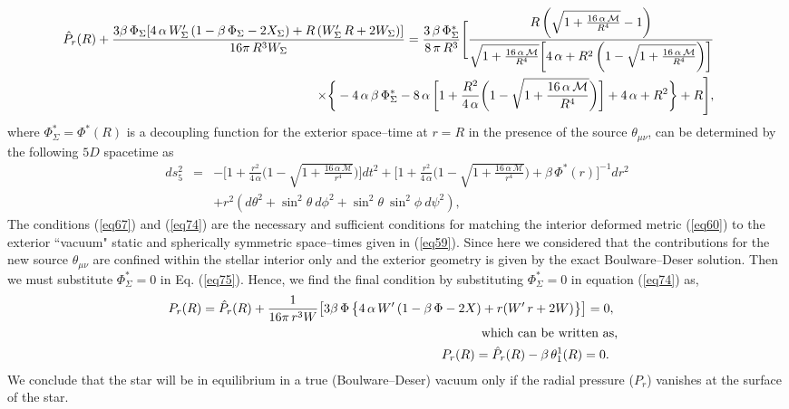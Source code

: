\documentclass[]{aastex631}
\begin{document}
\begin{eqnarray}
&&\hspace{-0.8cm} \hat{P}_r(R)+\frac{3 \beta\,\Phi_{\Sigma} [4 \,\alpha\, W_{\Sigma}^\prime\, (1 - \beta\, \Phi_{\Sigma} -2 X_{\Sigma}) + R\, (W_{\Sigma}^\prime\, R + 2 W_{\Sigma})]}{16 \pi\,R^3 W_{\Sigma}} =\frac{3\,\beta\,\Phi^{\ast}_{\Sigma}}{8\,\pi\,R^3} \Bigg[ \frac{R\, \bigg(\sqrt{1 + \frac{16\, \alpha\, \mathcal{M}}{R^4}}-1\bigg)}{\sqrt{1 + \frac{16 \,\alpha\, \mathcal{M}}{R^4}} \bigg[4 \,\alpha +R^2\, \bigg(1 - \sqrt{1 + \frac{16\,\alpha\, \mathcal{M}}{R^4}}\bigg) \bigg]}\nonumber\\
&&\hspace{0.2cm} \times \bigg\{-4\,\alpha\,\beta\, \Phi^{\ast}_{\Sigma} -8\,\alpha\,\bigg[1 + \frac{R^2}{4\,\alpha}\bigg(1 - \sqrt{1 + \frac{16\, \alpha\, \mathcal{M}}{R^4}}\bigg)\bigg]+4\,\alpha+R^2\bigg\}+R\Bigg], \label{eq74}
\end{eqnarray}
where $\Phi^{\ast}_{\Sigma}=\Phi^{\ast}(R)$ is a decoupling function for the exterior space--time at $r=R$ in the presence of the source $\theta_{\mu\nu}$, can be determined by the
following $5D$ spacetime as
\begin{eqnarray}
ds^2_{5} &=& - \bigg[1 + \frac{r^2}{4\,\alpha}\bigg(1 - \sqrt{1 + \frac{16\, \alpha\, \mathcal{M}}{r^4}}\bigg)\bigg] dt^2 + \bigg[1 + \frac{r^2}{4\,\alpha}\bigg(1 - \sqrt{1 + \frac{16\, \alpha\, \mathcal{M}}{r^4}}\bigg)+\beta\,\Phi^{\ast}(r)\bigg]^{-1} dr^2 \nonumber\\
&&+ r^{2}\left(d \theta^2+\sin^2 \theta~ d\phi^2+\sin^2 \theta~ \sin^2 \phi ~d\psi^2 \right), \label{eq75}
\end{eqnarray}
The conditions (\ref{eq67}) and (\ref{eq74}) are the necessary and sufficient conditions for matching the interior deformed metric (\ref{eq60}) to the exterior ``vacuum" static and spherically symmetric space--times given in (\ref{eq59}). Since here we considered that the contributions for the new source $\theta_{\mu\nu}$ are confined within the stellar interior only and the exterior geometry is given by the exact Boulware--Deser solution. Then we must substitute $\Phi^{\ast}_{\Sigma}=0$ in Eq. (\ref{eq75}). Hence, we find the final condition by substituting $\Phi^{\ast}_{\Sigma}=0$ in equation (\ref{eq74}) as,
\begin{eqnarray}
&&\hspace{-0.6cm} P_r(R) =  \hat{P}_r(R)+ \frac{1}{16 \pi\,r^3 W} \big[3 \beta\,\Phi\, \big\{4 \,\alpha\, W^\prime\, (1 - \beta\, \Phi -2 X)  + r (W^\prime\, r + 2 W)\big\}\big] =0,~ \label{eq76}\\
&&\hspace{-0.6cm} \text{which~can~be~written~as,}\nonumber\\
 &&\hspace{-0.6cm} P_r(R)=\hat{P}_r(R)-\beta\,\theta^1_1(R) = 0.~~ \label{eq77} 
\end{eqnarray}
We conclude that the star will be in equilibrium in a true  (Boulware--Deser) vacuum only if the radial pressure ($P_r$) vanishes at the surface of the star.
\end{document}
